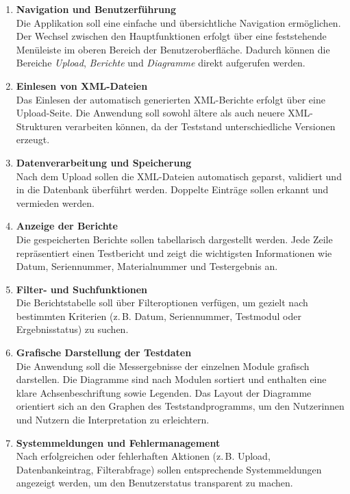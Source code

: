 \begin{enumerate}
  \item \textbf{Navigation und Benutzerführung} \\
  Die Applikation soll eine einfache und übersichtliche Navigation ermöglichen.
  Der Wechsel zwischen den Hauptfunktionen erfolgt über eine feststehende Menüleiste im oberen Bereich der Benutzeroberfläche.
  Dadurch können die Bereiche \textit{Upload}, \textit{Berichte} und \textit{Diagramme} direkt aufgerufen werden.

  \item \textbf{Einlesen von XML-Dateien} \\
  Das Einlesen der automatisch generierten XML-Berichte erfolgt über eine Upload-Seite.
  Die Anwendung soll sowohl ältere als auch neuere XML-Strukturen verarbeiten können, da der Teststand unterschiedliche Versionen erzeugt.

  \item \textbf{Datenverarbeitung und Speicherung} \\
  Nach dem Upload sollen die XML-Dateien automatisch geparst, validiert und in die Datenbank überführt werden.
  Doppelte Einträge sollen erkannt und vermieden werden.

  \item \textbf{Anzeige der Berichte} \\
  Die gespeicherten Berichte sollen tabellarisch dargestellt werden.
  Jede Zeile repräsentiert einen Testbericht und zeigt die wichtigsten Informationen wie Datum, Seriennummer, Materialnummer und Testergebnis an.

  \item \textbf{Filter- und Suchfunktionen} \\
  Die Berichtstabelle soll über Filteroptionen verfügen, um gezielt nach bestimmten Kriterien
  (z.\,B. Datum, Seriennummer, Testmodul oder Ergebnisstatus) zu suchen.

  \item \textbf{Grafische Darstellung der Testdaten} \\
  Die Anwendung soll die Messergebnisse der einzelnen Module grafisch darstellen.
  Die Diagramme sind nach Modulen sortiert und enthalten eine klare Achsenbeschriftung sowie Legenden.
  Das Layout der Diagramme orientiert sich an den Graphen des Teststandprogramms, um den Nutzerinnen und Nutzern die Interpretation zu erleichtern.

  \item \textbf{Systemmeldungen und Fehlermanagement} \\
  Nach erfolgreichen oder fehlerhaften Aktionen (z.\,B. Upload, Datenbankeintrag, Filterabfrage) sollen entsprechende Systemmeldungen angezeigt werden, um den Benutzerstatus transparent zu machen.


\end{enumerate}
